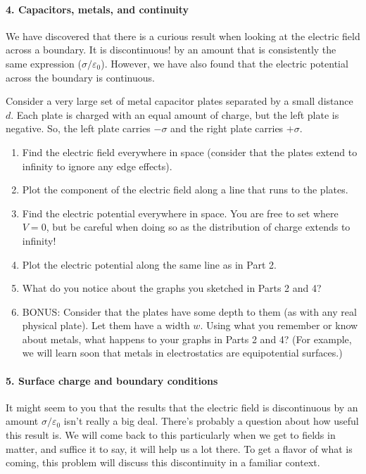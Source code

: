 \documentclass[11pt]{article}
\def\tightlist{}
\begin{document}
\paragraph{4. Capacitors, metals, and
continuity}\label{capacitors-metals-and-continuity}

We have discovered that there is a curious result when looking at the
electric field across a boundary. It is discontinuous! by an amount that
is consistently the same expression (\(\sigma/\varepsilon_0\)). However,
we have also found that the electric potential across the boundary is
continuous.

Consider a very large set of metal capacitor plates separated by a small
distance \(d\). Each plate is charged with an equal amount of charge,
but the left plate is negative. So, the left plate carries \(-\sigma\)
and the right plate carries \(+\sigma\).

\begin{enumerate}
\def\labelenumi{\arabic{enumi}.}
\tightlist
\item
  Find the electric field everywhere in space (consider that the plates
  extend to infinity to ignore any edge effects).
\item
  Plot the component of the electric field along a line that runs to the
  plates.
\item
  Find the electric potential everywhere in space. You are free to set
  where \(V=0\), but be careful when doing so as the distribution of
  charge extends to infinity!
\item
  Plot the electric potential along the same line as in Part 2.
\item
  What do you notice about the graphs you sketched in Parts 2 and 4?
\item
  BONUS: Consider that the plates have some depth to them (as with any
  real physical plate). Let them have a width \(w\). Using what you
  remember or know about metals, what happens to your graphs in Parts 2
  and 4? (For example, we will learn soon that metals in electrostatics
  are equipotential surfaces.)
\end{enumerate}

\paragraph{5. Surface charge and boundary
conditions}\label{surface-charge-and-boundary-conditions}

It might seem to you that the results that the electric field is
discontinuous by an amount \(\sigma/\varepsilon_0\) isn't really a big
deal. There's probably a question about how useful this result is. We
will come back to this particularly when we get to fields in matter, and
suffice it to say, it will help us a lot there. To get a flavor of what
is coming, this problem will discuss this discontinuity in a familiar
context.
\end{document}
